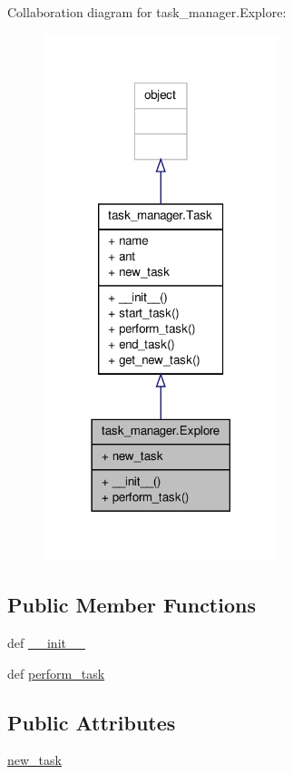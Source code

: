 Collaboration diagram for task\+\_\+manager.\+Explore\+:\nopagebreak
\begin{figure}[H]
\begin{center}
\leavevmode
\includegraphics[width=194pt]{classtask__manager_1_1Explore__coll__graph}
\end{center}
\end{figure}
\subsection*{Public Member Functions}
\begin{DoxyCompactItemize}
\item 
def \hyperlink{classtask__manager_1_1Explore_ae95cc7a4676c07732fcf0faed752959c}{\+\_\+\+\_\+init\+\_\+\+\_\+}
\item 
def \hyperlink{classtask__manager_1_1Explore_a8ba5647950e170022bec93bc73c4a8de}{perform\+\_\+task}
\end{DoxyCompactItemize}
\subsection*{Public Attributes}
\begin{DoxyCompactItemize}
\item 
\hyperlink{classtask__manager_1_1Explore_ab1f83ac00c442f8eedd1403a59e74060}{new\+\_\+task}
\end{DoxyCompactItemize}


